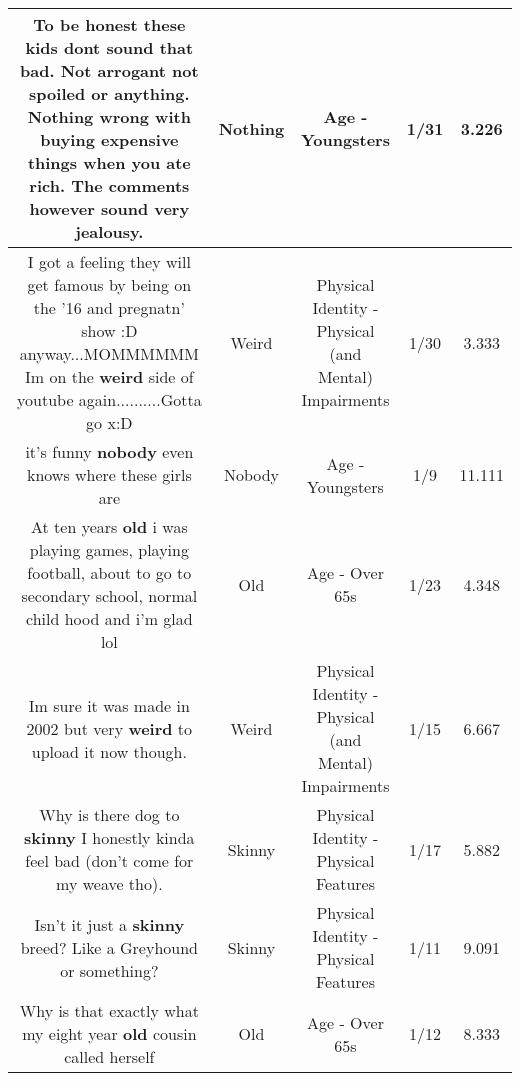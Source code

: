 \documentclass[11pt]{article}
\newlength\mylength
\begin{document}
\begin{center}
\begin{longtable}{|C{.65\mylength}|C{.30\mylength}|C{.12\mylength}|C{.12\mylength}|C{.12\mylength}|}
  \small To be honest these kids dont sound that bad. Not arrogant not spoiled or anything. \textbf{Nothing} wrong with buying expensive things when you ate rich. The comments however sound very jealousy.\normalsize   & Nothing & Age - Youngsters & 1/31 & 3.226 \\  \hline
  \small I got a feeling they will get famous by being on the '16 and pregnatn' show :D anyway...MOMMMMMM Im on the \textbf{weird} side of youtube again..........Gotta go x:D\normalsize   & Weird & Physical Identity - Physical (and Mental) Impairments & 1/30 & 3.333 \\  \hline
  \small it's funny \textbf{nobody} even knows where these girls are\normalsize   & Nobody & Age - Youngsters & 1/9 & 11.111 \\  \hline
  \small At ten years \textbf{old} i was playing games, playing football, about to go to secondary school, normal child hood and i'm glad lol\normalsize   & Old & Age - Over 65s & 1/23 & 4.348 \\  \hline
  \small Im sure it was made in 2002 but very \textbf{weird} to upload it now though.\normalsize   & Weird & Physical Identity - Physical (and Mental) Impairments & 1/15 & 6.667 \\  \hline
  \small Why is there dog to \textbf{skinny} I honestly kinda feel bad (don't come for my weave tho).\normalsize   & Skinny & Physical Identity - Physical Features & 1/17 & 5.882 \\  \hline
  \small Isn't it just a \textbf{skinny} breed? Like a Greyhound or something?\normalsize   & Skinny & Physical Identity - Physical Features & 1/11 & 9.091 \\  \hline
  \small Why is that exactly what my eight year \textbf{old} cousin called herself\normalsize   & Old & Age - Over 65s & 1/12 & 8.333 \\  \hline

\end{longtable}
\end{center}
\end{document}

